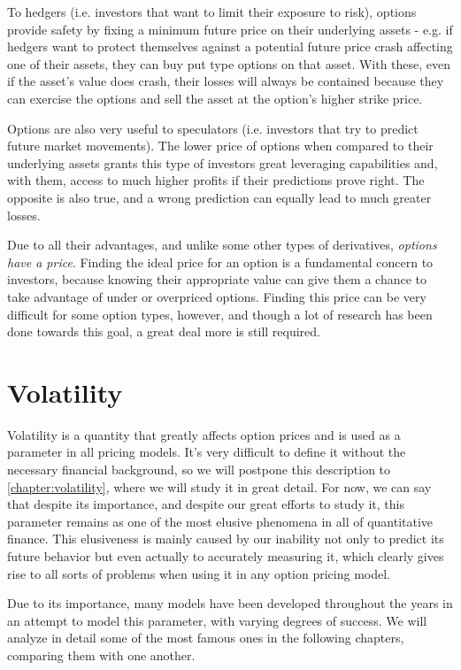 To hedgers (i.e. investors that want to limit their exposure to risk), options provide safety by fixing a minimum future price on their underlying assets - e.g. if hedgers want to protect themselves against a potential future price crash affecting one of their assets, they can buy put type options on that asset. With these, even if the asset's value does crash, their losses will always be contained because they can exercise the options and sell the asset at the option's higher strike price.

Options are also very useful to speculators (i.e. investors that try to predict future market movements). The lower price of options when compared to their underlying assets grants this type of investors great leveraging capabilities and, with them, access to much higher profits if their predictions prove right. The opposite is also true, and a wrong prediction can equally lead to much greater losses.

Due to all their advantages, and unlike some other types of derivatives, \emph{options have a price}. Finding the ideal price for an option is a fundamental concern to investors, because knowing their appropriate value can give them a chance to take advantage of under or overpriced options.
Finding this price can be very difficult for some option types, however, and though a lot of research has been done towards this goal, a great deal more is still required.


\section{Volatility}
Volatility is a quantity that greatly affects option prices and is used as a parameter in all pricing models. It's very difficult to define it without the necessary financial background, so we will postpone this description to \autoref{chapter:volatility}, where we will study it in great detail.
For now, we can say that despite its importance, and despite our great efforts to study it, this parameter remains as one of the most elusive phenomena in all of quantitative finance. This elusiveness is mainly caused by our inability not only to predict its future behavior but even actually to accurately measuring it, which clearly gives rise to all sorts of problems when using it in any option pricing model.

Due to its importance, many models have been developed throughout the years in an attempt to model this parameter, with varying degrees of success. We will analyze in detail some of the most famous ones in the following chapters, comparing them with one another.

